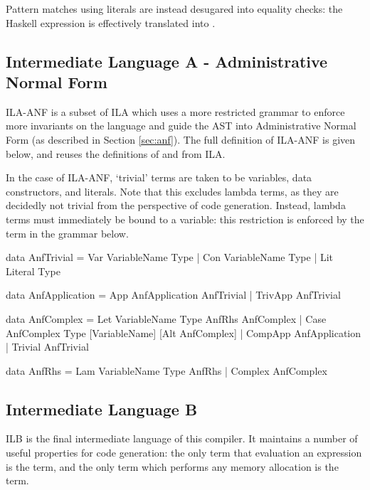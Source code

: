 \documentclass[dissertation.tex]{subfiles}
\begin{document}
{{{            Pattern matches using literals are instead desugared into equality checks: the Haskell expression  is effectively translated into .
        }
    }
    \subsection{Intermediate Language A - Administrative Normal Form}
    {
        ILA-ANF is a subset of ILA which uses a more restricted grammar to enforce more invariants on the language and guide the AST into Administrative Normal Form (as described in Section \ref{sec:anf}). The full definition of ILA-ANF is given below, and reuses the definitions of  and  from ILA. 

        In the case of ILA-ANF, `trivial' terms are taken to be variables, data constructors, and literals. Note that this excludes lambda terms, as they are decidedly not trivial from the perspective of code generation. Instead, lambda terms must immediately be bound to a variable: this restriction is enforced by the  term in the grammar below.

        \begin{haskellfigure}
        data AnfTrivial = Var VariableName Type
                        | Con VariableName Type
                        | Lit Literal Type

        data AnfApplication = App AnfApplication AnfTrivial
                            | TrivApp AnfTrivial

        data AnfComplex = Let VariableName Type AnfRhs AnfComplex
                        | Case AnfComplex Type [VariableName] [Alt AnfComplex]
                        | CompApp AnfApplication
                        | Trivial AnfTrivial

        data AnfRhs = Lam VariableName Type AnfRhs
                    | Complex AnfComplex
        \end{haskellfigure}
    }
    \subsection{Intermediate Language B}
    {
        ILB is the final intermediate language of this compiler. It maintains a number of useful properties for code generation: the only term that evaluation an expression is the  term, and the only term which performs any memory allocation is the  term.

}}
\end{document}
